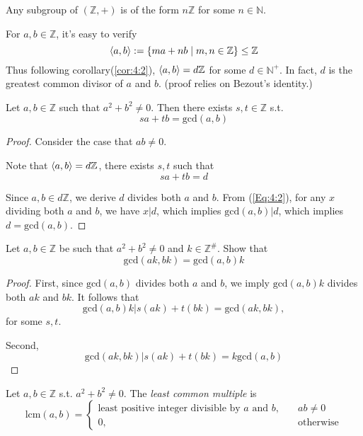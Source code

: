 \begin{corollary}\label{cor:4:2}
Any subgroup of $(\mathbb{Z},+)$ is of the form $n\mathbb{Z}$ for some $n\in\mathbb{N}$.
\end{corollary}
\begin{remark}
For $a,b\in\mathbb{Z}$, it's easy to verify
\begin{equation}
\langle a,b\rangle:=\{ma+nb\mid m,n\in\mathbb{Z}\}\le\mathbb{Z}
\end{equation}
Thus following corollary(\ref{cor:4:2}), $\langle a,b\rangle=d\mathbb{Z}$ for some $d\in\mathbb{N}^+$. In fact, $d$ is the greatest common divisor of $a$ and $b$. (proof relies on Bezout's identity.)
\end{remark}
\begin{theorem}
Let $a,b\in\mathbb{Z}$ such that $a^2+b^2\ne0$. Then there exists $s,t\in\mathbb{Z}$ s.t.
\[
sa+tb=\mbox{gcd}(a,b)
\]
\end{theorem}
\begin{proof}
Consider the case that $ab\ne0$.

Note that $\langle a,b\rangle=d\mathbb{Z}$, there exists $s,t$ such that
\begin{equation}\label{Eq:4:2}
sa+tb=d
\end{equation}

Since $a,b\in d\mathbb{Z}$, we derive $d$ divides both $a$ and $b$. From (\ref{Eq:4:2}), for any $x$ dividing both $a$ and $b$, we have $x|d$, which implies $\mbox{gcd}(a,b)|d$, which implies $d=\mbox{gcd}(a,b)$.
\end{proof}
\begin{proposition}
Let $a,b\in\mathbb{Z}$ be such that $a^2+b^2\ne0$ and $k\in\mathbb{Z}^{\#}$. Show that
\[
\mbox{gcd}(ak,bk) = \mbox{gcd}(a,b)k
\]
\end{proposition}
\begin{proof}
First, since $\mbox{gcd}(a,b)$ divides both $a$ and $b$, we imply $\mbox{gcd}(a,b)k$ divides both $ak$ and $bk$. It follows that
\[
\mbox{gcd}(a,b)k|s(ak)+t(bk)=\mbox{gcd}(ak,bk),
\]
for some $s,t$.

Second, 
\[
\mbox{gcd}(ak,bk)|s(ak)+t(bk)=k\mbox{gcd}(a,b)
\]
\end{proof}
Let $a,b\in\mathbb{Z}$ s.t. $a^2+b^2\ne0$. The \emph{least common multiple} is
\[
\mbox{lcm}(a,b)=\left\{
\begin{aligned}
\mbox{least positive integer divisible by $a$ and $b$},&\quad ab\ne0\\
0,&\quad \mbox{otherwise}
\end{aligned}
\right.
\]
